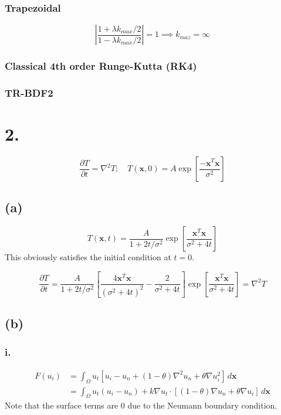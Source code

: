 \documentclass{article}
\begin{document}
\subsubsection*{Trapezoidal}
\begin{equation}
|\frac{1+\lambda k_{max}/2}{1-\lambda k_{max}/2}|=1\implies k_{maz}=\infty
\end{equation}

\subsubsection*{Classical 4th order Runge-Kutta (RK4)}

\subsubsection*{TR-BDF2}

\section*{2.}
\begin{equation}
\frac{\partial T}{\partial t}=\nabla^2T;\quad T(\mathbf x,0)=A\exp\left[\frac{-\mathbf{x}^T\mathbf{x}}{\sigma^2}\right]
\end{equation}

\subsection*{(a)}
\begin{equation}
T(\mathbf{x},t)=\frac{A}{1+2t/\sigma^2}\exp\left[\frac{\mathbf{x}^T\mathbf x}{\sigma^2+4t}\right]
\end{equation}
This obviously satisfies the initial condition at $t=0$.

\begin{equation}
\frac{\partial T}{\partial t}=\frac{A}{1+2t/\sigma^2}\left[\frac{4\mathbf{x}^T\mathbf{x}}{(\sigma^2+4t)^2}-\frac{2}{\sigma^2+4t}\right]\exp\left[\frac{\mathbf{x}^T\mathbf x}{\sigma^2+4t}\right]=\nabla^2T
\end{equation}

\subsection*{(b)}
\subsubsection*{i.}
\begin{align}
F(u_i)&=\int_\Omega u_t[u_i-u_n+(1-\theta)\nabla^2 u_n+\theta\nabla u_i^2]\,d\mathbf x \nonumber\\
&=\int_\Omega u_t(u_i-u_n)+k\nabla u_t\cdot[(1-\theta)\nabla u_n+\theta\nabla u_i]\,d\mathbf x
\end{align}
Note that the surface terms are 0 due to the Neumann boundary condition. 
\end{document}
